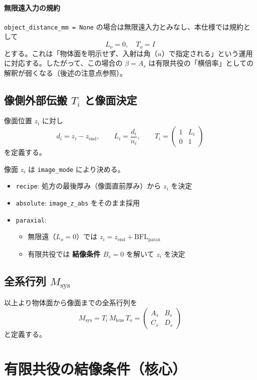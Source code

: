 \paragraph{無限遠入力の規約}
\texttt{object\_distance\_mm = None} の場合は無限遠入力とみなし、本仕様では規約として
\[
L_o = 0,\quad T_o = I
\]
とする。これは「物体面を明示せず、入射は角（$u$）で指定される」という運用に対応する。したがって、この場合の $\beta=A_s$ は有限共役の「横倍率」としての解釈が弱くなる（後述の注意点参照）。

\subsection{像側外部伝搬 $T_i$ と像面決定}
像面位置 $z_i$ に対し
\[
d_i = z_i - z_{\mathrm{end}},
\qquad
L_i = \frac{d_i}{n_i},
\qquad
T_i=\begin{pmatrix}1&L_i\\0&1\end{pmatrix}
\]
を定義する。

像面 $z_i$ は \texttt{image\_mode} により決める。
\begin{itemize}
  \item \texttt{recipe}: 処方の最後厚み（像面直前厚み）から $z_i$ を決定
  \item \texttt{absolute}: \texttt{image\_z\_abs} をそのまま採用
  \item \texttt{paraxial}:
    \begin{itemize}
      \item 無限遠（$L_o=0$）では $z_i = z_{\mathrm{end}} + \mathrm{BFL}_{\mathrm{parax}}$
      \item 有限共役では \textbf{結像条件 $B_s=0$} を解いて $z_i$ を決定
    \end{itemize}
\end{itemize}

\subsection{全系行列 $M_{\mathrm{sys}}$}
以上より物体面から像面までの全系行列を
\[
M_{\mathrm{sys}} = T_i\, M_{\mathrm{lens}}\, T_o
=
\begin{pmatrix}
A_s&B_s\\C_s&D_s
\end{pmatrix}
\]
と定義する。

\section{有限共役の結像条件（核心）}

